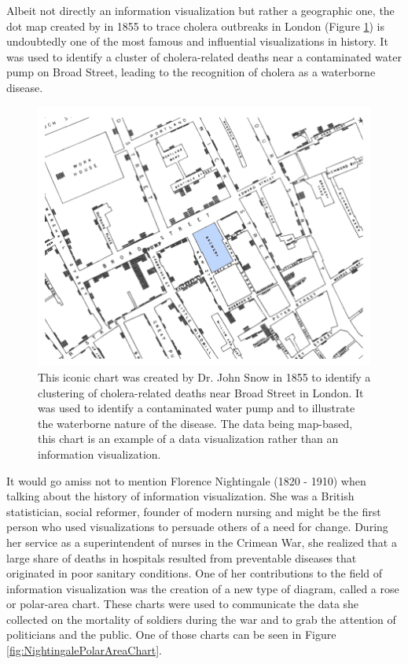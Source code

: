 Albeit not directly an information visualization but rather a geographic one, the dot map created by \cite{ModeOfCommunicationOfCholera} in 1855 to trace cholera outbreaks in London (Figure \ref{fig:CholeraDotMap}) is undoubtedly one of the most famous and influential visualizations in history. It was used to identify a cluster of cholera-related deaths near a contaminated water pump on Broad Street, leading to the recognition of cholera as a waterborne disease.

\begin{figure}[tp]
    \centering
    \includegraphics[keepaspectratio,width=\linewidth,height=\fullh / 3]
    {images/cholera-dot-map.png}
    \caption[Dot Map Plotting Cholera Deaths in London From 1855]{
        This iconic chart was created by Dr. John Snow in 1855 to identify a clustering of cholera-related deaths near Broad Street in London. It was used to identify a contaminated water pump and to illustrate the waterborne nature of the disease. The data being map-based, this chart is an example of a data visualization rather than an information visualization. 
    }
    \label{fig:CholeraDotMap}
\end{figure}

It would go amiss not to mention Florence Nightingale (1820 - 1910) \parencite{FlorenceNightingale} when talking about the history of information visualization. She was a British statistician, social reformer, founder of modern nursing and might be the first person who used visualizations to persuade others of a need for change. During her service as a superintendent of nurses in the Crimean War, she realized that a large share of deaths in hospitals resulted from preventable diseases that originated in poor sanitary conditions. One of her contributions to the field of information visualization was the creation of a new type of diagram, called a rose or polar-area chart. These charts were used to communicate the data she collected on the mortality of soldiers during the war and to grab the attention of politicians and the public. One of those charts can be seen in Figure \ref{fig:NightingalePolarAreaChart}.

